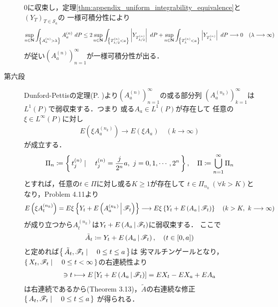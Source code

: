 \begin{prf}
\begin{description}
				0に収束し，定理\ref{thm:appendix_uniform_integrability_equivalence}と$(Y_T)_{T \in \mathscr{S}_a}$の
				一様可積分性により
				\begin{align}
					\operatorname*{sup}_{n \in \mathbf{N}} \int_{\left\{A^{(n)}_a > \lambda\right\}} A^{(n)}_a\ dP
					\leq 2 \operatorname*{sup}_{n \in \mathbf{N}} \int_{\left\{T^{(n)}_{\lambda/2} < a\right\}} \left|Y_{T^{(n)}_{\lambda/2}}\right|\ dP
					+ \operatorname*{sup}_{n \in \mathbf{N}} \int_{\left\{T^{(n)}_{\lambda} < a\right\}} \left|Y_{T^{(n)}_{\lambda}}\right|\ dP
					\longrightarrow 0
					\quad (\lambda \longrightarrow \infty)
				\end{align}
				が従い$\left( A^{(n)}_a \right)_{n=1}^\infty$が一様可積分性が出る．
				
			\item[第六段]
				Dunford-Pettisの定理(P. \pageref{thm:Dunford_Pettis})より$\left( A^{(n)}_a \right)_{n=1}^\infty$の或る部分列
				$\left( A^{(n_k)}_a \right)_{k=1}^\infty$は$L^1(P)$で弱収束する．つまり
				或る$A_a \in L^1(P)$が存在して
				任意の$\xi \in L^\infty(P)$に対し
				\begin{align}
					E \left( \xi A^{(n_k)}_a \right) \longrightarrow E (\xi A_a)
					\quad (k \longrightarrow \infty)
				\end{align}
				が成立する．
				\begin{align}
					\Pi_n \coloneqq \left\{\, t^{(n)}_j \mid \quad t^{(n)}_j = \frac{j}{2^n}a,\ j=0,1,\cdots,2^n\, \right\},
					\quad \Pi \coloneqq \bigcup_{n=1}^\infty \Pi_n
				\end{align}
				とすれば，任意の$t \in \Pi$に対し或る$K \geq 1$が存在して
				$t \in \Pi_{n_k}\ (\forall k > K)$となり，Problem 4.11より
				\begin{align}
					E \left( \xi A^{(n_k)}_t \right)
					= E \xi\left\{ Y_t + E\left( A^{(n_k)}_a \, \middle|\, \mathscr{F}_t \right) \right\}
					\longrightarrow E \xi\left\{ Y_t + E\left( A_a \, \middle|\, \mathscr{F}_t \right) \right\}
					\quad (k > K,\ k \longrightarrow \infty)
					\label{eq:chapter_1_theorem_4_10_7}
				\end{align}
				が成り立つから$A^{(n_k)}_t$は$Y_t + E\left( A_a \, \middle|\, \mathscr{F}_t \right)$に弱収束する．
				ここで
				\begin{align}
					\tilde{A}_t \coloneqq Y_t + E\left( A_a \, \middle|\, \mathscr{F}_t \right),
					\quad (t \in [0,a])
				\end{align}
				と定めれば$\left\{\, \tilde{A}_t,\mathscr{F}_t \mid \quad 0 \leq t \leq a\, \right\}$は
				劣マルチンゲールとなり，$\left\{\, X_t,\mathscr{F}_t \mid \quad 0 \leq t <\infty\, \right\}$の右連続性より
				\begin{align}
					[0,a] \ni t \longmapsto E\left[ Y_t + \cexp{A_a}{\mathscr{F}_t} \right]
					= E X_t - E X_a + E A_a
				\end{align}
				は右連続であるから(Theorem 3.13)，$\tilde{A}$の右連続な修正$\left\{\, A_t,\mathscr{F}_t \mid \quad 0 \leq t \leq a\, \right\}$
				が得られる．
			

\end{description}
\end{prf}
